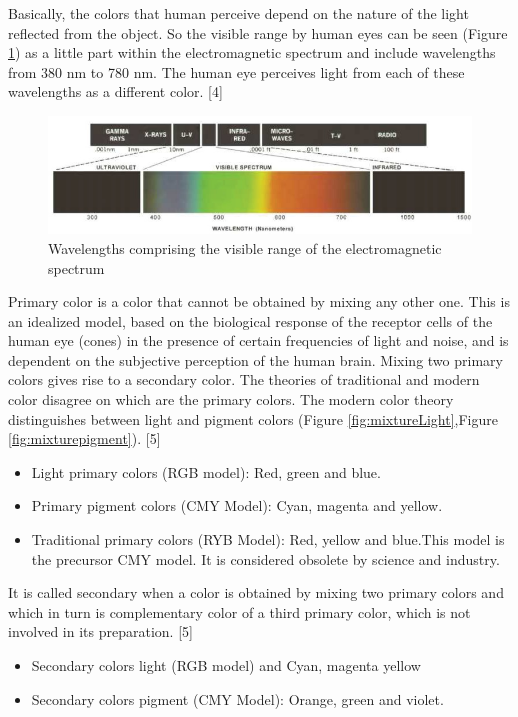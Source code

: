 Basically, the colors that human perceive depend on the nature of the light reflected from the object. So the visible range by human eyes can be seen (Figure \ref{fig:wavelength}) as a little part within the electromagnetic spectrum and include wavelengths from 380 nm to 780 nm. The human eye perceives light from each of these wavelengths as a different color. [4]


\begin{figure}
  \includegraphics[width=\linewidth]{images/ch2/wavelength.jpg}
  \caption{Wavelengths comprising the visible range of the electromagnetic spectrum}
  \label{fig:wavelength}
\end{figure}

Primary color is a color that cannot be obtained by mixing any other one. This is an idealized model, based on the biological response of the receptor cells of the human eye (cones) in the presence of certain frequencies of light and noise, and is dependent on the subjective perception of the human brain. Mixing two primary colors gives rise to a secondary color.
The theories of traditional and modern color disagree on which are the primary colors. The modern color theory distinguishes between light and pigment colors (Figure \ref{fig:mixtureLight},Figure \ref{fig:mixturepigment}). [5]

\begin{itemize}
	\item Light primary colors (RGB model): Red, green and blue.
	\item Primary pigment colors (CMY Model): Cyan, magenta and yellow.
	\item Traditional primary colors (RYB Model): Red, yellow and blue.This model is the precursor CMY model. It is considered obsolete by science and industry.
 
\end{itemize}

It is called secondary when a color is obtained by mixing two primary colors and which in turn is complementary color of a third primary color, which is not involved in its preparation. [5]

\begin{itemize}
	\item Secondary colors light (RGB model) and Cyan, magenta yellow
	\item  Secondary colors pigment (CMY Model): Orange, green and violet.
\end{itemize}

